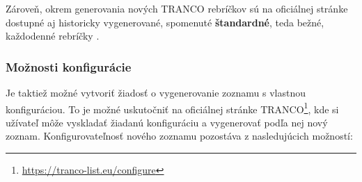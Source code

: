 Zároveň, okrem generovania nových TRANCO rebríčkov sú na oficiálnej stránke dostupné aj historicky vygenerované, spomenuté \textbf{štandardné}, teda bežné, každodenné rebríčky \cite{tranco-homepage}.

\subsubsection{Možnosti konfigurácie}
\label{tranco-config}

Je taktiež možné vytvoriť žiadosť o vygenerovanie zoznamu s vlastnou konfiguráciou. 
To je možné uskutočniť na oficiálnej stránke TRANCO\footnote{\href{https://tranco-list.eu/configure}{https://tranco-list.eu/configure}},
kde si užívateľ môže vyskladať žiadanú konfiguráciu a vygenerovať podľa nej nový zoznam.
Konfigurovateľnosť nového zoznamu pozostáva z nasledujúcich možností: \cite{tranco-config}
